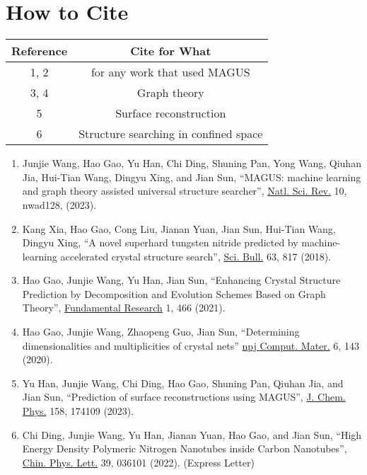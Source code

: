 \documentclass[12pt,oneside]{book}
\begin{document}
\section{How to Cite}
\begin{table}[H]
    \centering
    \begin{tabular}{c|c}
    Reference    &   Cite for What  \\ \hline
    1, 2       &   for any work that used MAGUS \\
    3, 4       &   Graph theory \\
    5          &   Surface reconstruction \\
    6          &   Structure searching in confined space \\
    \end{tabular}
\end{table}

\begin{enumerate}
    \item Junjie Wang, Hao Gao, Yu Han, Chi Ding, Shuning Pan, Yong Wang, Qiuhan Jia, Hui-Tian Wang, Dingyu Xing, and Jian Sun, ``MAGUS: machine learning and graph theory assisted universal structure searcher'', \href{https://doi.org/10.1093/nsr/nwad128}{Natl. Sci. Rev.} 10, nwad128, (2023).
    
    \item Kang Xia, Hao Gao, Cong Liu, Jianan Yuan, Jian Sun, Hui-Tian Wang, Dingyu Xing, ``A novel superhard tungsten nitride predicted by machine-learning accelerated crystal structure search'', \href{https://doi.org/10.1016/j.scib.2018.05.027}{Sci. Bull.} 63, 817 (2018).
    
    \item Hao Gao, Junjie Wang, Yu Han, Jian Sun, ``Enhancing Crystal Structure Prediction by Decomposition and Evolution Schemes Based on Graph Theory'', \href{https://doi.org/10.1016/j.fmre.2021.06.005}{Fundamental Research} 1, 466 (2021).
    
    \item Hao Gao, Junjie Wang, Zhaopeng Guo, Jian Sun, ``Determining dimensionalities and multiplicities of crystal nets'' \href{https://doi.org/10.1038/s41524-020-00409-0}{npj Comput. Mater.} 6, 143 (2020).
    
    \item Yu Han, Junjie Wang, Chi Ding, Hao Gao, Shuning Pan, Qiuhan Jia, and Jian Sun, ``Prediction of surface reconstructions using MAGUS'', \href{https://doi.org/10.1063/5.0142281}{J. Chem. Phys.} 158, 174109 (2023).
    
    \item Chi Ding, Junjie Wang, Yu Han, Jianan Yuan, Hao Gao, and Jian Sun, ``High Energy Density Polymeric Nitrogen Nanotubes inside Carbon Nanotubes'', \href{https://doi.org/10.1088/0256-307X/39/3/036101}{Chin. Phys. Lett.} 39, 036101 (2022). (Express Letter)
\end{enumerate}
\end{document}
